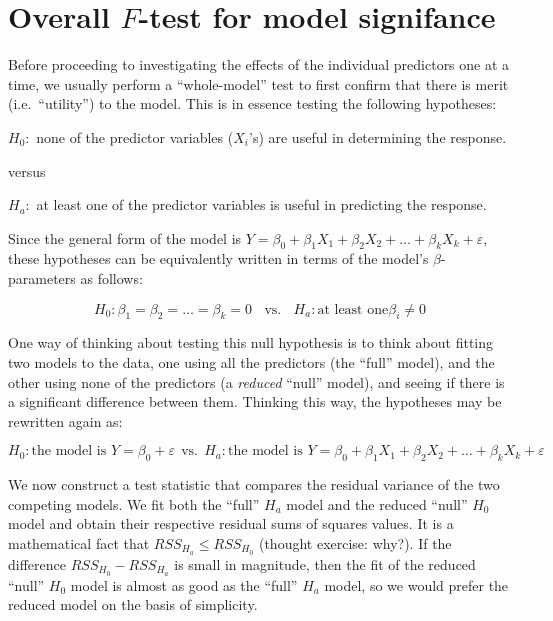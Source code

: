 \documentclass[
]{book}
\begin{document}
\hypertarget{overall-f-test-for-model-signifance}{%
\section{\texorpdfstring{Overall \(F\)-test for model signifance}{Overall F-test for model signifance}}\label{overall-f-test-for-model-signifance}}

Before proceeding to investigating the effects of the individual predictors one at a time, we usually perform a ``whole-model'' test to first confirm that there is merit (i.e.~``utility'') to the model.
This is in essence testing the following hypotheses:

\(H_0:\) none of the predictor variables (\(X_i\)'s) are useful in determining the response.

versus

\(H_a:\) at least one of the predictor variables is useful in predicting the response.

Since the general form of the model is \(Y = \beta_0 + \beta_1 X_1 + \beta_2 X_2 + \ldots + \beta_k X_k + \varepsilon\), these hypotheses can be equivalently written in terms of the model's \(\beta\)-parameters as follows:

\[H_0: \beta_1 = \beta_2 = \ldots = \beta_k = 0 ~~~~\textrm{vs.}~~~~ H_a: \textrm{at least one} \beta_i \neq 0\]

One way of thinking about testing this null hypothesis is to think about fitting two models to the data, one using all the predictors (the ``full'' model), and the other using none of the predictors (a \emph{reduced} ``null'' model), and seeing if there is a significant difference between them.
Thinking this way, the hypotheses may be rewritten again as:

\[H_0: \textrm{the model is } Y = \beta_0 + \varepsilon ~~\textrm{vs.}~~ H_a: \textrm{the model is } Y = \beta_0 + \beta_1 X_1 + \beta_2 X_2 + \ldots + \beta_k X_k + \varepsilon\]

We now construct a test statistic that compares the residual variance of the two competing models.
We fit both the ``full'' \(H_a\) model and the reduced ``null'' \(H_0\) model and obtain their respective residual sums of squares values.
It is a mathematical fact that \(RSS_{H_a} \leq RSS_{H_0}\) (thought exercise: why?).
If the difference \(RSS_{H_0}-RSS_{H_a}\) is small in magnitude, then the fit of the reduced ``null'' \(H_0\) model is almost as good as the ``full'' \(H_a\) model, so we would prefer the reduced model on the basis of simplicity.
\end{document}
